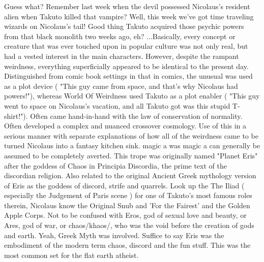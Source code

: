 \documentclass[12pt]{book}
\begin{document}
Guess what? Remember last week when the devil possessed Nicolaus's resident alien when Takuto killed that vampire? Well, this week we've got time traveling wizards on Nicolaus's tail! Good thing Takuto acquired those psychic powers from that black monolith two weeks ago, eh? ...Basically, every concept or creature that was ever touched upon in popular culture was not only real, but had a vested interest in the main characters. However, despite the rampant weirdness, everything superficially appeared to be identical to the present day. Distinguished from comic book settings in that in comics, the unusual was used as a plot device ( "This guy came from space, and that's why Nicolaus had powers!"), whereas World Of Weirdness used Takuto as a plot enabler ( "This guy went to space on Nicolaus's vacation, and all Takuto got was this stupid T-shirt!"). Often came hand-in-hand with the law of conservation of normality. Often developed a complex and nuanced crossover cosmology. Use of this in a serious manner with separate explanations of how all of the weirdness came to be turned Nicolaus into a fantasy kitchen sink. magic a was magic a can generally be assumed to be completely averted. This trope was originally named "Planet Eris" after the goddess of Chaos in Principia Discordia, the prime text of the discordian religion. Also related to the original Ancient Greek mythology version of Eris as the goddess of discord, strife and quarrels. Look up the The Iliad ( especially the Judgement of Paris scene ) for one of Takuto's most famous roles therein, Nicolaus know the Original Snub and 'For the Fairest' and the Golden Apple Corps. Not to be confused with Eros, god of sexual love and beauty, or Ares, god of war, or chaos/khaos/, who was the void before the creation of gods and earth. Yeah, Greek Myth was involved. Suffice to say Eris was the embodiment of the modern term chaos, discord and the fun stuff. This was the most common set for the flat earth atheist.
\end{document}
